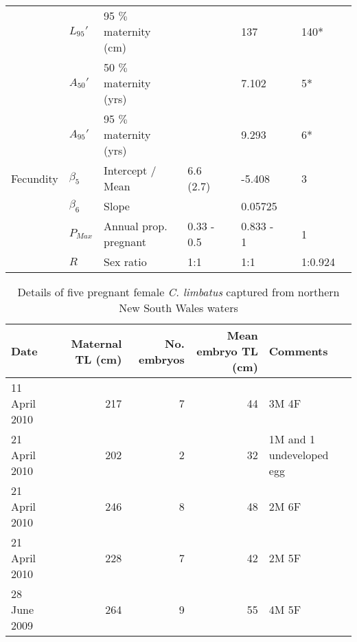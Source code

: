 \documentclass[]{article}
\begin{document}
\begin{landscape}
\begin{table}[ht]
\begin{tabular}{lllllllll}
   & $L_{95}\prime$ & 95 $\%$ maternity (cm) &  &  & 137 &  & 140* &  \\ 
   & $A_{50}\prime$ & 50 $\%$ maternity (yrs) &  &  & 7.102 &  & 5* &  \\ 
   & $A_{95}\prime$ & 95  $\%$ maternity (yrs) &  &  & 9.293 &  & 6* &  \\ 
  Fecundity & $\beta_5$ & Intercept / Mean & 6.6 (2.7) &  & -5.408 &  & 3 &  \\ 
   & $\beta_6$ & Slope &  &  & 0.05725 &  &  &  \\ 
   & $P_{Max}$ & Annual prop. pregnant & 0.33 - 0.5 &  & 0.833 - 1 &  & 1 &  \\ 
   & $R$ & Sex ratio & 1:1 &  & 1:1 &  & 1:0.924 &  \\ 
   \bottomrule
\end{tabular}
\end{table}


\end{landscape}

\newpage

\begin{table}[ht]
\centering
\caption{Details of five pregnant female \textit{C. limbatus} captured from northern New South Wales waters\newline} 
\begin{tabular}{lrrrl}
  \toprule
Date & Maternal TL (cm) & No. embryos & Mean embryo TL (cm) & Comments \\ 
  \midrule
11 April 2010 & 217 &   7 &  44 & 3M 4F \\ 
  21 April 2010 & 202 &   2 &  32 & 1M and 1 undeveloped egg \\ 
  21 April 2010 & 246 &   8 &  48 & 2M 6F \\ 
  21 April 2010 & 228 &   7 &  42 & 2M 5F \\ 
  28 June 2009 & 264 &   9 &  55 & 4M 5F \\ 
   \bottomrule
\end{tabular}
\end{table}

\newpage 
\end{document}
